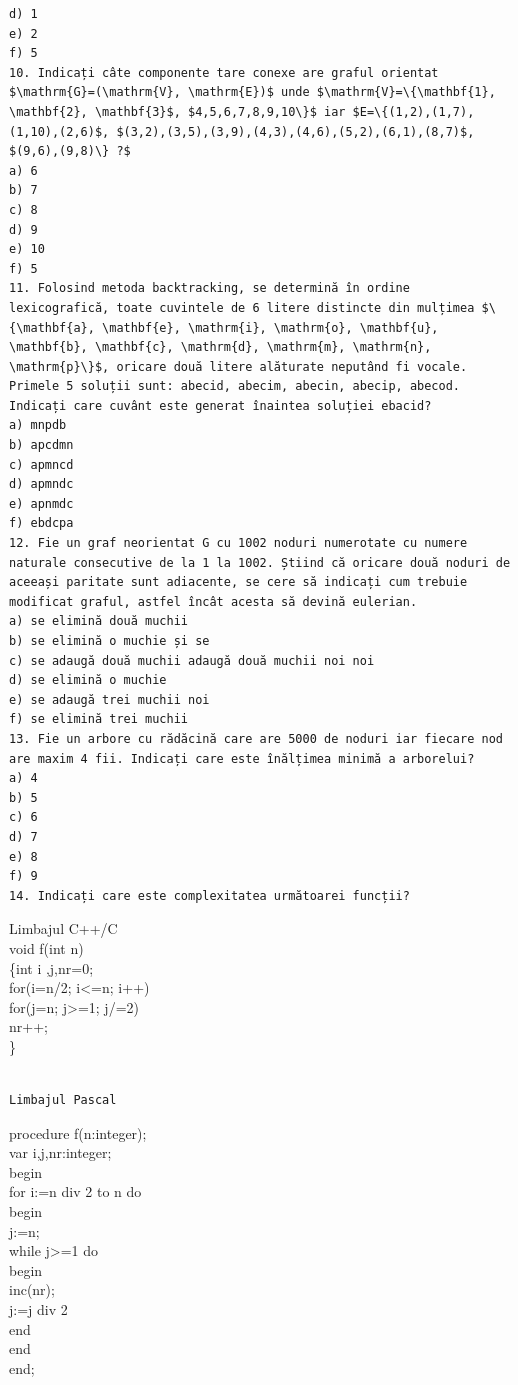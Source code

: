 \documentclass[10pt]{article}
\begin{document}
\begin{verbatim}
d) 1
e) 2
f) 5
10. Indicați câte componente tare conexe are graful orientat $\mathrm{G}=(\mathrm{V}, \mathrm{E})$ unde $\mathrm{V}=\{\mathbf{1}, \mathbf{2}, \mathbf{3}$, $4,5,6,7,8,9,10\}$ iar $E=\{(1,2),(1,7),(1,10),(2,6)$, $(3,2),(3,5),(3,9),(4,3),(4,6),(5,2),(6,1),(8,7)$, $(9,6),(9,8)\} ?$
a) 6
b) 7
c) 8
d) 9
e) 10
f) 5
11. Folosind metoda backtracking, se determină în ordine lexicografică, toate cuvintele de 6 litere distincte din mulțimea $\{\mathbf{a}, \mathbf{e}, \mathrm{i}, \mathrm{o}, \mathbf{u}, \mathbf{b}, \mathbf{c}, \mathrm{d}, \mathrm{m}, \mathrm{n}, \mathrm{p}\}$, oricare două litere alăturate neputând fi vocale. Primele 5 soluții sunt: abecid, abecim, abecin, abecip, abecod. Indicați care cuvânt este generat înaintea soluției ebacid?
a) mnpdb
b) apcdmn
c) apmncd
d) apmndc
e) apnmdc
f) ebdcpa
12. Fie un graf neorientat G cu 1002 noduri numerotate cu numere naturale consecutive de la 1 la 1002. Știind că oricare două noduri de aceeași paritate sunt adiacente, se cere să indicați cum trebuie modificat graful, astfel încât acesta să devină eulerian.
a) se elimină două muchii
b) se elimină o muchie și se
c) se adaugă două muchii adaugă două muchii noi noi
d) se elimină o muchie
e) se adaugă trei muchii noi
f) se elimină trei muchii
13. Fie un arbore cu rădăcină care are 5000 de noduri iar fiecare nod are maxim 4 fii. Indicați care este înălțimea minimă a arborelui?
a) 4
b) 5
c) 6
d) 7
e) 8
f) 9
14. Indicați care este complexitatea următoarei funcții?
\end{verbatim}

Limbajul C++/C\\
void f(int n)\\
\{int i ,j,nr=0;\\
for(i=n/2; i<=n; i++)\\
for(j=n; j>=1; j/=2)\\
nr++;\\
\}

\begin{verbatim}

Limbajul Pascal
\end{verbatim}

procedure f(n:integer);\\
var i,j,nr:integer;\\
begin\\
for i:=n div 2 to n do\\
begin\\
j:=n;\\
while j>=1 do\\
begin\\
inc(nr);\\
j:=j div 2\\
end\\
end\\
end;
\end{document}
